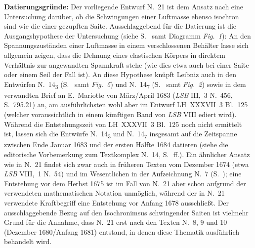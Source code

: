 \begin{ledgroup}
\footnotesize
\pstart
\noindent
\textbf{Datierungsgründe:}
Der vorliegende Entwurf N.~21 ist dem Ansatz nach eine Untersuchung darüber, ob die Schwingungen einer Luftmasse ebenso isochron sind wie die einer gezupften Saite.
Ausschlaggebend für die Datierung ist die Ausgangshypothese der Untersuchung (siehe S.~ samt Diagramm \lbrack\textit{Fig.~1}\rbrack):
An den Spannungszuständen einer Luftmasse in einem verschlossenen Behälter lasse sich allgemein zeigen, dass die Dehnung eines elastischen Körpers in direktem Verhältnis zur angewandten Spannkraft stehe (wie dies etwa auch bei einer Saite oder einem Seil der Fall ist).
An diese Hypothese knüpft Leibniz auch in den Entwürfen N.~14\textsubscript{3} (S.~ samt \lbrack\textit{Fig.~5}\rbrack) und N.~14\textsubscript{7} (S.~ samt \lbrack\textit{Fig.~2}\rbrack) sowie in dem verwandten Brief an E.~Mariotte von März/April 1683 (\protect{}\cite{01262}\textit{LSB} III,~3 N.~456, S.~795.21) an, am ausführlichsten wohl aber im Entwurf LH~XXXVII~3 Bl.~125 (welcher voraussichtlich in einem künftigen Band von \textit{LSB} VIII ediert wird).
Während die Entstehungszeit von LH~XXXVII~3 Bl.~125 noch nicht ermittelt ist, lassen sich die Entwürfe N.~14\textsubscript{3} und N.~14\textsubscript{7} insgesamt auf die Zeitspanne zwischen Ende Januar 1683 und der ersten Hälfte 1684 datieren (siehe die editorische Vorbemerkung zum Textkomplex N.~14, S.~\,ff.).
Ein ähnlicher Ansatz wie in N.~21 findet sich zwar auch in früheren Texten vom Dezember 1674 (etwa \textit{LSB} VIII,~1 N.~54)
und im Wesentlichen in der Aufzeichnung N.~7 (S.~);
eine Entstehung vor dem Herbst 1675 ist im Fall von N.~21 aber schon aufgrund der verwendeten mathematischen Notation unmöglich,
während der in N.~21 verwendete Kraftbegriff eine Entstehung vor Anfang 1678 ausschließt.
Der ausschlaggebende Bezug auf den Isochronimsus schwingender Saiten ist vielmehr Grund für die Annahme, dass N.~21 erst nach den Texten N.~8, 9 und 10 (Dezember 1680/Anfang 1681) entstand, in denen diese Thematik ausführlich behandelt wird.

\end{ledgroup}
